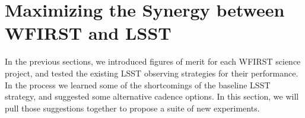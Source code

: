 %
%
%

\section{Maximizing the Synergy between WFIRST and LSST}
\def\secname{\chpname:proposals}\label{sec:\secname}


In the previous sections, we introduced figures of merit for each WFIRST
science project, and tested the existing LSST observing strategies for
their performance. In the process we learned some of the shortcomings of the
baseline LSST strategy, and suggested some alternative cadence
options. In this section, we will pull those suggestions together to propose a
suite of new \OpSim experiments.



\navigationbar

